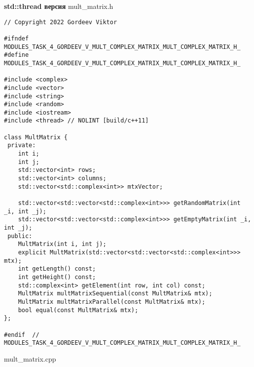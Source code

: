 \documentclass{report}
\begin{document}
\textbf{std::thread версия}
\newline
\newline mult_matrix.h
\begin{lstlisting}
// Copyright 2022 Gordeev Viktor

#ifndef MODULES_TASK_4_GORDEEV_V_MULT_COMPLEX_MATRIX_MULT_COMPLEX_MATRIX_H_
#define MODULES_TASK_4_GORDEEV_V_MULT_COMPLEX_MATRIX_MULT_COMPLEX_MATRIX_H_

#include <complex>
#include <vector>
#include <string>
#include <random>
#include <iostream>
#include <thread> // NOLINT [build/c++11]

class MultMatrix {
 private:
    int i;
    int j;
    std::vector<int> rows;
    std::vector<int> columns;
    std::vector<std::complex<int>> mtxVector;

    std::vector<std::vector<std::complex<int>>> getRandomMatrix(int _i, int _j);
    std::vector<std::vector<std::complex<int>>> getEmptyMatrix(int _i, int _j);
 public:
    MultMatrix(int i, int j);
    explicit MultMatrix(std::vector<std::vector<std::complex<int>>> mtx);
    int getLength() const;
    int getHeight() const;
    std::complex<int> getElement(int row, int col) const;
    MultMatrix multMatrixSequential(const MultMatrix& mtx);
    MultMatrix multMatrixParallel(const MultMatrix& mtx);
    bool equal(const MultMatrix& mtx);
};

#endif  // MODULES_TASK_4_GORDEEV_V_MULT_COMPLEX_MATRIX_MULT_COMPLEX_MATRIX_H_

\end{lstlisting}
mult_matrix.cpp
\end{document}
